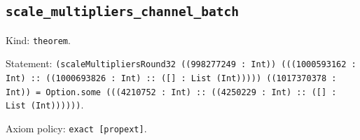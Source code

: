 \documentclass[11pt]{article}
\begin{document}
\subsection*{\texttt{scale\_multipliers\_channel\_batch}}
\noindent Kind: \texttt{theorem}.\par
\noindent Statement: \texttt{(scaleMultipliersRound32 ((998277249 : Int)) (((1000593162 : Int) :: ((1000693826 : Int) :: ([] : List (Int))))) ((1017370378 : Int)) = Option.some (((4210752 : Int) :: ((4250229 : Int) :: ([] : List (Int))))))}.\par
\noindent Axiom policy: \texttt{exact [propext]}.\par
\end{document}
